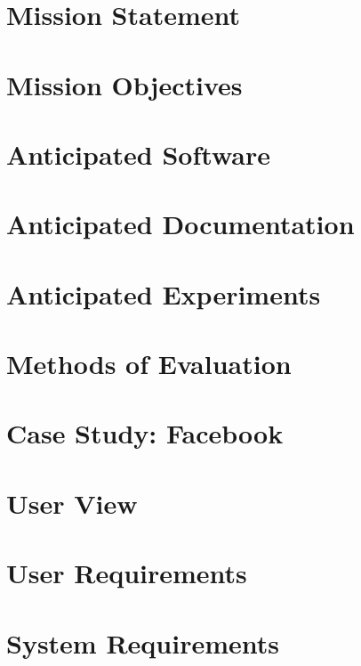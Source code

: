 \chapter{Mission Statement}


\chapter{Mission Objectives}


\chapter{Anticipated Software}


\chapter{Anticipated Documentation}


\chapter{Anticipated Experiments}


\chapter{Methods of Evaluation}


\chapter{Case Study: Facebook}


\chapter{User View}


\chapter{User Requirements}


\chapter{System Requirements}


